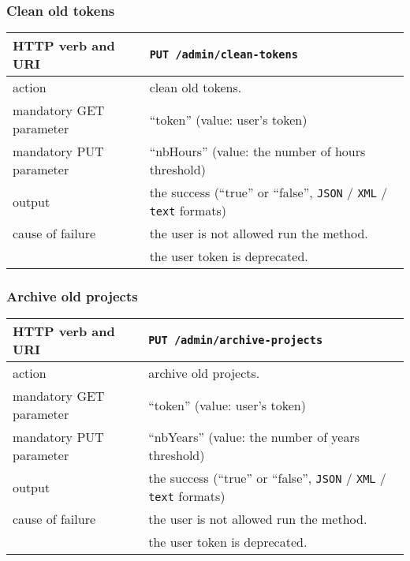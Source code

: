 \subsubsection{Clean old tokens}
\begin{tabular}{ | l | l | }
	\hline
	HTTP verb and URI & \texttt{PUT /admin/clean-tokens} \\
	\hline
	action & clean old tokens. \\
	\hline
	mandatory GET parameter & ``token'' (value: user's token) \\
	\hline
	mandatory PUT parameter & ``nbHours'' (value: the number of hours threshold) \\
	\hline
	output & the success (``true'' or ``false'', \texttt{JSON} / \texttt{XML} / \texttt{text} formats) \\
	\hline
	cause of failure & the user is not allowed run the method. \\
	\space & the user token is deprecated. \\
	\hline
\end{tabular}
\newline

\subsubsection{Archive old projects}
\begin{tabular}{ | l | l | }
	\hline
	HTTP verb and URI & \texttt{PUT /admin/archive-projects} \\
	\hline
	action & archive old projects. \\
	\hline
	mandatory GET parameter & ``token'' (value: user's token) \\
	\hline
	mandatory PUT parameter & ``nbYears'' (value: the number of years threshold) \\
	\hline
	output & the success (``true'' or ``false'', \texttt{JSON} / \texttt{XML} / \texttt{text} formats) \\
	\hline
	cause of failure & the user is not allowed run the method. \\
	\space & the user token is deprecated. \\
	\hline
\end{tabular}
\newline


